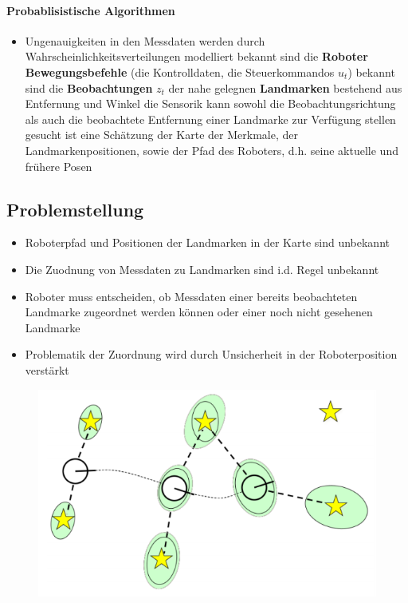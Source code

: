 \paragraph{Probablisistische Algorithmen}
\begin{itemize}
	\item Ungenauigkeiten in den Messdaten werden durch Wahrscheinlichkeitsverteilungen modelliert
	\subitem bekannt sind die \textbf{Roboter Bewegungsbefehle} (die Kontrolldaten, die Steuerkommandos $u_t$)
	\subitem bekannt sind die \textbf{Beobachtungen} $z_t$ der nahe gelegnen \textbf{Landmarken} bestehend aus Entfernung und Winkel
	\subitem die Sensorik kann sowohl die Beobachtungsrichtung als auch die beobachtete Entfernung einer Landmarke zur Verfügung stellen
	\subitem gesucht ist eine Schätzung der Karte der Merkmale, der Landmarkenpositionen, sowie der Pfad des Roboters, d.h. seine aktuelle und frühere Posen
\end{itemize}
\subsection{Problemstellung}
\begin{itemize}
	\item Roboterpfad und Positionen der Landmarken in der Karte sind unbekannt
	\item Die Zuodnung von Messdaten zu Landmarken sind i.d. Regel unbekannt
	\item Roboter muss entscheiden, ob Messdaten einer bereits beobachteten Landmarke zugeordnet werden können oder einer noch nicht gesehenen Landmarke
	\item Problematik der Zuordnung wird durch Unsicherheit in der Roboterposition verstärkt
\end{itemize}
\begin{figure}[H]
	\begin{center}
		\includegraphics[scale=0.5]{Resources/PNG/ProbabilisitischeLandmarken.PNG}
		\caption{}
		\label{fig:PNG/ProbabilistischeLandmarken.PNG}
	\end{center}
\end{figure}
